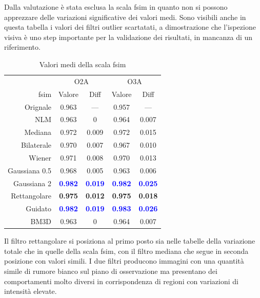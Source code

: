 \documentclass[../main.tex]{subfiles}
\begin{document}
Dalla valutazione è stata esclusa la scala \acrshort{fsim} in quanto non si possono apprezzare delle variazioni significative dei valori medi. Sono visibili anche in questa tabella i valori dei filtri outlier scartatati, a dimostrazione che l'ispezione visiva è uno step importante per la validazione dei risultati, in mancanza di un riferimento.\medskip

\begin{table}[ht]
	\centering
	\begin{tabular}{r||cc|cc}
		&  \multicolumn{2}{c|}{O2A} &  \multicolumn{2}{c}{O3A}  \\
		\acrshort{fsim}\hspace{10pt} & Valore & Diff & Valore & Diff \\		\hline\hline
		Orignale   		& 0.963 & ---   & 0.957 & --- \\
		NLM         	& 0.963 & 0     & 0.964 & 0.007 \\
		Mediana     	& 0.972 & 0.009 & 0.972 & 0.015 \\
		Bilaterale    	& 0.970 & 0.007 & 0.967 & 0.010 \\
		Wiener        	& 0.971 & 0.008 & 0.970 & 0.013 \\
		Gaussiana 0.5 	& 0.968 & 0.005 & 0.963 & 0.006 \\
		Gaussiana 2   	& \textcolor{blue}{\textbf{0.982}} & \textcolor{blue}{\textbf{0.019}} & \textcolor{blue}{\textbf{0.982}} & \textcolor{blue}{\textbf{0.025}} \\
		Rettangolare 	& \textbf{0.975} & \textbf{0.012} & \textbf{0.975} & \textbf{0.018} \\
		Guidato        	& \textcolor{blue}{\textbf{0.982}} & \textcolor{blue}{\textbf{0.019}} & \textcolor{blue}{\textbf{0.983}} & \textcolor{blue}{\textbf{0.026}} \\
		BM3D   			& 0.963 & 0     & 0.964 & 0.007	
	\end{tabular}
	\caption[Valori medi della scala FSIM]{
		Valori medi della scala \acrshort{fsim}}
\end{table}

Il filtro rettangolare si posiziona al primo posto sia nelle tabelle della variazione totale che in quelle della scala \acrshort{fsim}, con il filtro mediana che segue in seconda posizione con valori simili. I due filtri producono immagini con una quantità simile di rumore bianco sul piano di osservazione ma presentano dei comportamenti molto diversi in corrispondenza di regioni con variazioni di intensità elevate.\medskip
\end{document}
